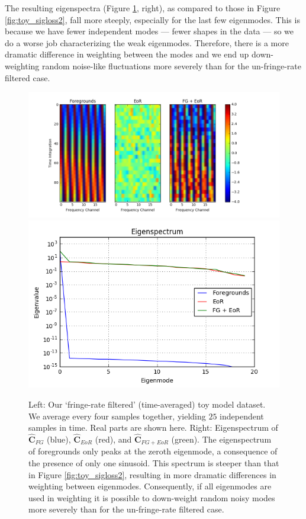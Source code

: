 \documentclass[preprint2,numberedappendix,tighten]{aastex6}  %
\begin{document}
The resulting eigenspectra (Figure \ref{fig:toy_sigloss5}, right), as compared to those in Figure \ref{fig:toy_sigloss2}, fall more steeply, especially for the last few eigenmodes. This is because we have fewer independent modes --- fewer shapes in the data --- so we do a worse job characterizing the weak eigenmodes. Therefore, there is a more dramatic difference in weighting between the modes and we end up down-weighting random noise-like fluctuations more severely than for the un-fringe-rate filtered case. 

\begin{figure}
	\centering
	\includegraphics[trim={1.5cm 0.2cm 3.5cm 0.3cm},clip,height=0.3\textwidth]{plots/toy_sigloss5.png}
	\includegraphics[trim={0.3cm 0.2cm 0.3cm 0.3cm},clip,height=0.3\textwidth]{plots/toy_sigloss6.png}
	\caption{Left: Our `fringe-rate filtered' (time-averaged) toy model dataset. We average every four samples together, yielding $25$ independent samples in time. Real parts are shown here. Right: Eigenspectrum of $\hat{\textbf{C}}_{FG}$ (blue), $\hat{\textbf{C}}_{EoR}$ (red), and $\hat{\textbf{C}}_{FG+EoR}$ (green). The eigenspectrum of foregrounds only peaks at the zeroth eigenmode, a consequence of the presence of only one sinusoid. This spectrum is steeper than that in Figure \ref{fig:toy_sigloss2}, resulting in more dramatic differences in weighting between eigenmodes. Consequently, if all eigenmodes are used in weighting it is possible to down-weight random noisy modes more severely than for the un-fringe-rate filtered case.}
	\label{fig:toy_sigloss5}
\end{figure}
\end{document}
